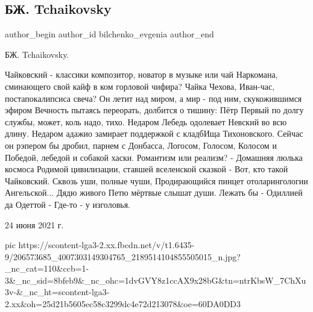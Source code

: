  
 
 
 
 
 
\subsection{БЖ. Tchaikovsky}
\label{sec:24_06_2021.fb.bilchenko_evgenia.8.tchaikovskij}
\ifcmt
 author_begin
   author_id bilchenko_evgenia
 author_end
\fi

БЖ. Tchaikovsky.

\begin{multicols}{3}
\obeycr
Чайковский - классики композитор, новатор в музыке или чай
Наркомана, сминающего свой кайф в ком горловой чифира?
Чайка Чехова, Иван-час, постапокалипсиса свеча?
\smallskip
Он летит над миром, а мир - под ним, скукожившимся эфиром
Вечность пытаясь переорать, долбится о тишину:
Пётр Первый по долгу службы, может, коль надо, тихо.
Недаром Лебедь одолевает Невский во всю длину.
\smallskip
Недаром адажио замирает поддержкой с кладбИща Тихоновского. 
Сейчас он рэпером бы дробил, парнем с Донбасса, Логосом,
Голосом, Колосом и Победой, лебедой и собакой хаски.
Романтизм или реализм? - Домашняя люлька космоса
\smallskip
Родимой цивилизации, ставшей вселенской сказкой -
Вот, кто такой Чайковский. Сквозь уши, полные чуши,
Продирающийся пинцет отоларингологии
Ангельской... Дядю живого Петю мёртвые слышат души.
Лежать бы - Одиллией да Одеттой - Где-то - у изголовья.
\restorecr
\end{multicols}

24 июня 2021 г.

\ifcmt
  pic https://scontent-lga3-2.xx.fbcdn.net/v/t1.6435-9/206573685_4007303149304765_2189514104855505015_n.jpg?_nc_cat=110&ccb=1-3&_nc_sid=8bfeb9&_nc_ohc=1dvGVY8z1ccAX9x28bG&tn=ntrKbsW_7ChXu3v-&_nc_ht=scontent-lga3-2.xx&oh=25d21b5605ec58c3299dc4e72d213078&oe=60DA0DD3
\fi
